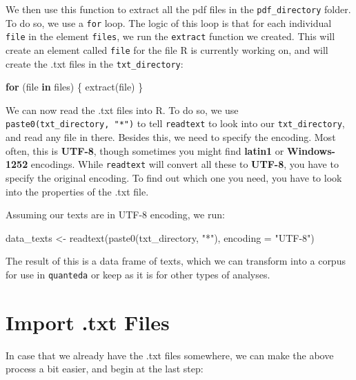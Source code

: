 \documentclass[
]{book}
\newenvironment{Shaded}{\begin{snugshade}}{\end{snugshade}}
\newcommand{\AttributeTok}[1]{\textcolor[rgb]{0.77,0.63,0.00}{#1}}
\newcommand{\ControlFlowTok}[1]{\textcolor[rgb]{0.13,0.29,0.53}{\textbf{#1}}}
\newcommand{\FunctionTok}[1]{\textcolor[rgb]{0.00,0.00,0.00}{#1}}
\newcommand{\NormalTok}[1]{#1}
\newcommand{\OtherTok}[1]{\textcolor[rgb]{0.56,0.35,0.01}{#1}}
\newcommand{\StringTok}[1]{\textcolor[rgb]{0.31,0.60,0.02}{#1}}
\begin{document}
We then use this function to extract all the pdf files in the \texttt{pdf\_directory} folder. To do so, we use a \texttt{for} loop. The logic of this loop is that for each individual \texttt{file} in the element \texttt{files}, we run the \texttt{extract} function we created. This will create an element called \texttt{file} for the file R is currently working on, and will create the .txt files in the \texttt{txt\_directory}:

\begin{Shaded}
\begin{Highlighting}[]
\ControlFlowTok{for}\NormalTok{ (file }\ControlFlowTok{in}\NormalTok{ files) \{}
    \FunctionTok{extract}\NormalTok{(file)}
\NormalTok{\}}
\end{Highlighting}
\end{Shaded}

We can now read the .txt files into R. To do so, we use \texttt{paste0(txt\_directory,\ "*")} to tell \texttt{readtext} to look into our \texttt{txt\_directory}, and read any file in there. Besides this, we need to specify the encoding. Most often, this is \textbf{UTF-8}, though sometimes you might find \textbf{latin1} or \textbf{Windows-1252} encodings. While \texttt{readtext} will convert all these to \textbf{UTF-8}, you have to specify the original encoding. To find out which one you need, you have to look into the properties of the .txt file.

Assuming our texts are in UTF-8 encoding, we run:

\begin{Shaded}
\begin{Highlighting}[]
\NormalTok{data\_texts }\OtherTok{\textless{}{-}} \FunctionTok{readtext}\NormalTok{(}\FunctionTok{paste0}\NormalTok{(txt\_directory, }\StringTok{"*"}\NormalTok{), }\AttributeTok{encoding =} \StringTok{"UTF{-}8"}\NormalTok{)}
\end{Highlighting}
\end{Shaded}

The result of this is a data frame of texts, which we can transform into a corpus for use in \texttt{quanteda} or keep as it is for other types of analyses.

\hypertarget{import-.txt-files}{%
\section{Import .txt Files}\label{import-.txt-files}}

In case that we already have the .txt files somewhere, we can make the above process a bit easier, and begin at the last step:
\end{document}

